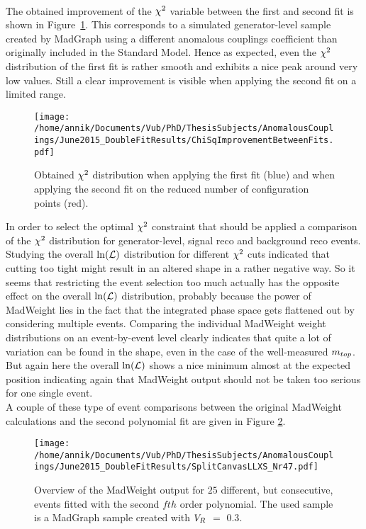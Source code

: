 \\
The obtained improvement of the $\chi^{2}$ variable between the first and second fit is shown in Figure~\ref{fig::ChiSqImprovement}. This corresponds to a simulated generator-level sample created by MadGraph using a different anomalous couplings coefficient than originally included in the Standard Model. Hence as expected, even the $\chi^{2}$ distribution of the first fit is rather smooth and exhibits a nice peak around very low values. Still a clear improvement is visible when applying the second fit on a limited range.
\begin{figure}[h!t]
 \centering
 \texttt{[image: /home/annik/Documents/Vub/PhD/ThesisSubjects/AnomalousCouplings/June2015\_DoubleFitResults/ChiSqImprovementBetweenFits.pdf]}
 \caption{Obtained $\chi^{2}$ distribution when applying the first fit (blue) and when applying the second fit on the reduced number of configuration points (red).}
 \label{fig::ChiSqImprovement}
\end{figure}

In order to select the optimal $\chi^{2}$ constraint that should be applied a comparison of the $\chi^{2}$ distribution for generator-level, signal reco and background reco events. Studying the overall $\ln(\mathcal{L})$ distribution for different $\chi^{2}$ cuts indicated that cutting too tight might result in an altered shape in a rather negative way. So it seems that restricting the event selection too much actually has the opposite effect on the overall $\ln(\mathcal{L})$ distribution, probably because the power of MadWeight lies in the fact that the integrated phase space gets flattened out by considering multiple events. Comparing the individual MadWeight weight distributions on an event-by-event level clearly indicates that quite a lot of variation can be found in the shape, even in the case of the well-measured $m_{top}$. But again here the overall $\ln(\mathcal{L})$ shows a nice minimum almost at the expected position indicating again that MadWeight output should not be taken too serious for one single event.\\
A couple of these type of event comparisons between the original MadWeight calculations and the second polynomial fit are given in Figure \ref{fig::SplitCanvas}.
\\
\begin{figure}[h!t]
 \centering
 \texttt{[image: /home/annik/Documents/Vub/PhD/ThesisSubjects/AnomalousCouplings/June2015\_DoubleFitResults/SplitCanvasLLXS\_Nr47.pdf]}
 \caption{Overview of the MadWeight output for $25$ different, but consecutive, events fitted with the second $fth$ order polynomial. The used sample is a MadGraph sample created with $V_{R}$ $=$ $0.3$.}
 \label{fig::SplitCanvas}
\end{figure}

